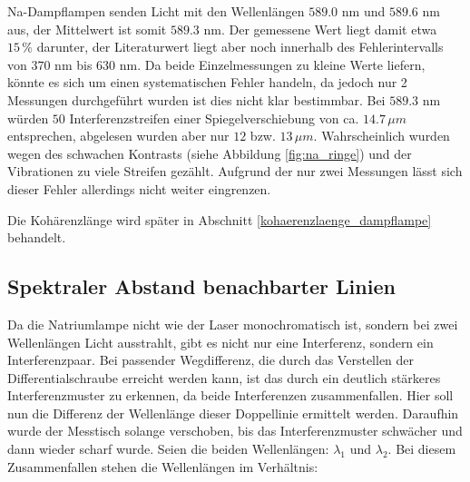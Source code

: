 \documentclass[
  headings=optiontotocandhead,
  twoside,
  openright,
  numbers=noenddot,
  toc=flat,
  11pt,
  parskip=full,
  listof=flat,
  bibliography=totoc,
  a4paper,
  DIV=14,
  BCOR=22mm,
  headheight=5mm,
  headinclude=true,
]{scrartcl}
\begin{document}

 
Na-Dampflampen senden Licht mit den Wellenlängen $589.0$ nm und $589.6$ nm aus, der Mittelwert ist somit $589.3$ nm. Der gemessene Wert liegt damit etwa $15 \,\%$ darunter, der Literaturwert liegt aber noch innerhalb des Fehlerintervalls von $370$ nm bis $630$ nm. Da beide Einzelmessungen zu kleine Werte liefern, könnte es sich um einen systematischen Fehler handeln, da jedoch nur 2 Messungen durchgeführt wurden ist dies nicht klar bestimmbar. Bei $589.3$ nm würden $50$ Interferenzstreifen einer Spiegelverschiebung von ca. $14.7 \, \mu m$ entsprechen, abgelesen wurden aber nur $12$ bzw. $13 \, \mu m$. Wahrscheinlich wurden wegen des schwachen Kontrasts (siehe Abbildung \ref{fig:na_ringe}) und der Vibrationen zu viele Streifen gezählt. Aufgrund der nur zwei Messungen lässt sich dieser Fehler allerdings nicht weiter eingrenzen.

Die Kohärenzlänge wird später in Abschnitt \ref{kohaerenzlaenge_dampflampe} behandelt.

\subsection{Spektraler Abstand benachbarter Linien} \label{spektraler_abstand}

Da die Natriumlampe nicht wie der Laser monochromatisch ist, sondern bei zwei Wellenlängen Licht ausstrahlt, gibt es nicht nur eine Interferenz, sondern ein Interferenzpaar. Bei passender Wegdifferenz, die durch das Verstellen der Differentialschraube erreicht werden kann, ist das durch ein deutlich stärkeres Interferenzmuster zu erkennen, da beide Interferenzen zusammenfallen. Hier soll nun die Differenz der Wellenlänge dieser Doppellinie ermittelt werden. Daraufhin wurde der Messtisch solange verschoben,  bis das Interferenzmuster schwächer und dann wieder scharf wurde. Seien die beiden Wellenlängen: $\lambda_{1}$ und $\lambda_{2}$. Bei diesem Zusammenfallen stehen die Wellenlängen im Verhältnis: 
\end{document}
